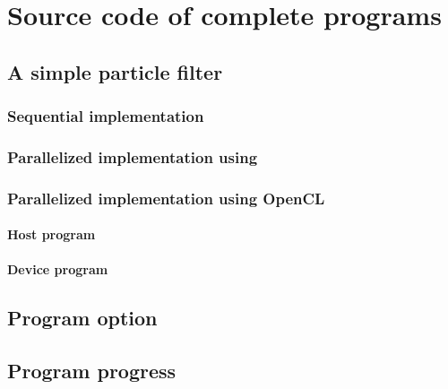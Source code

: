 \appendix

\chapter{Source code of complete programs}
\label{app:chap:Source code of complete programs}

\section{A simple particle filter}
\label{app:sec:A simle particle fitler}

\subsection{Sequential implementation}
\label{app:sub:Sequential implementation}


\subsection{Parallelized implementation using \protect\tbb}
\label{app:sub:Parallelized implementation using TBB}


\subsection{Parallelized implementation using OpenCL}
\label{app:sub:Paralleized implementation using OpenCL}

\subsubsection{Host program}
\label{app:sub:Host program}


\subsubsection{Device program}
\label{app:sub:Device program}


\section{Program option}
\label{app:sec:Program option}


\section{Program progress}
\label{app:sec:Program progress}

